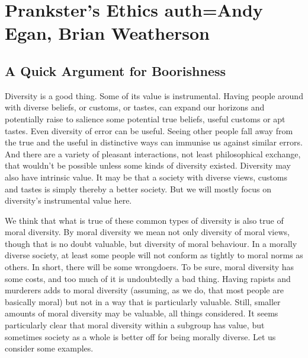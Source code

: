 
%
%
%
%
%
%
%
%
%
%
\chapter[Prankster's Ethics]{Prankster's Ethics auth=Andy Egan, Brian Weatherson}



\section{A Quick Argument for Boorishness}

Diversity is a good thing. Some of its value is instrumental. Having people around with diverse beliefs, or customs, or tastes, can expand our horizons and potentially raise to salience some potential true beliefs, useful customs or apt tastes. Even diversity of error can be useful. Seeing other people fall away from the true and the useful in distinctive ways can immunise us against similar errors. And there are a variety of pleasant interactions, not least philosophical exchange, that wouldn't be possible unless some kinds of diversity existed. Diversity may also have intrinsic value. It may be that a society with diverse views, customs and tastes is simply thereby a better society. But we will mostly focus on diversity's instrumental value here.

We think that what is true of these common types of diversity is also true of moral diversity. By moral diversity we mean not only diversity of moral views, though that is no doubt valuable, but diversity of moral behaviour. In a morally diverse society, at least some people will not conform as tightly to moral norms as others. In short, there will be some wrongdoers. To be sure, moral diversity has some costs, and too much of it is undoubtedly a bad thing. Having rapists and murderers adds to moral diversity (assuming, as we do, that most people are basically moral) but not in a way that is particularly valuable. Still, smaller amounts of moral diversity may be valuable, all things considered. It seems particularly clear that moral diversity within a subgroup has value, but sometimes society as a whole is better off for being morally diverse. Let us consider some examples.

